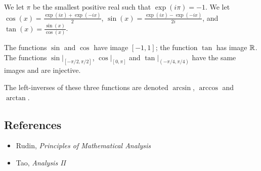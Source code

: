 \begin{defn}
    We let $\pi$ be the smallest positive real such that $\exp(i\pi)=-1$. We let
    $\cos(x)=\frac{\exp(ix)+\exp(-ix)}2$,
    $\sin(x)=\frac{\exp(ix)-\exp(-ix)}{2i}$, and
    $\tan(x)=\frac{\sin(x)}{\cos(x)}$.
\end{defn}
\begin{prop}
    The functions $\sin$ and $\cos$ have image $[-1,1]$; the function $\tan$ has
    image $\mathbb{R}$. The functions $\sin|_{[-\pi/2,\pi/2]}$, $\cos|_{[0,\pi]}$ and
    $\tan|_{(-\pi/4,\pi/4)}$ have the same images and are injective.
\end{prop}
\begin{defn}
    The left-inverses of these three functions are denoted $\arcsin$,
    $\arccos$ and $\arctan$.
\end{defn}
\subsection*{References}
\begin{itemize}
    \item Rudin, \emph{Principles of Mathematical Analysis}
    \item Tao, \emph{Analysis II}
\end{itemize}
